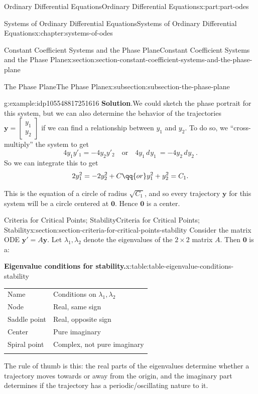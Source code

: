 \documentclass[twoside,10pt,]{book}
\newcommand{\blocktitlefont}{\relax}
\newcommand{\tabularfont}{\relax}
\numberwithin{equation}{part}
\newcommand{\hrulethick} {\noalign{\hrule height 0.11em}}
\renewcommand{\vec}[1]{\mathbf{#1}}
\providecommand{\dd}[2][]{\, d^{#1} #2\ }
\begin{document}
\begin{partptx}{Ordinary Differential Equations}{}{Ordinary Differential Equations}{}{}{x:part:part-odes}
\begin{chapterptx}{Systems of Ordinary Differential Equations}{}{Systems of Ordinary Differential Equations}{}{}{x:chapter:systems-of-odes}
\begin{sectionptx}{Constant Coefficient Systems and the Phase Plane}{}{Constant Coefficient Systems and the Phase Plane}{}{}{x:section:section-constant-coefficient-systems-and-the-phase-plane}
\begin{subsectionptx}{The Phase Plane}{}{The Phase Plane}{}{}{x:subsection:subsection-the-phase-plane}
\begin{example}{}{g:example:idp105548817251616}
\noindent\textbf{\blocktitlefont Solution}.\hypertarget{g:solution:idp105548817253664}{}\quad{}We could sketch the phase portrait for this system, but we can also determine the behavior of the trajectories \(\vec{y} = \begin{bmatrix} y_{1} \\ y_{2} \end{bmatrix} \) if we can find a relationship between \(y_{1}\) and \(y_{2}\). To do so, we ``cross-multiply'' the system to get%
\begin{equation*}
4y_{1}y'_{1} = -4y_{2}y'_{2} \quad\text{or}\quad 4y_{1}\dd{y_{1}} = -4y_{2}\dd{y_{2}}.
\end{equation*}
So we can integrate this to get%
\begin{equation*}
2y_{1}^{2} = -2y_{2}^{2}+C\qq{or}y_{1}^{2}+y_{2}^{2} = C_{1}.
\end{equation*}
%
\par
This is the equation of a circle of radius \(\sqrt{C_{1}}\), and so every trajectory \(\vec{y}\) for this system will be a circle centered at \(\vec{0}\). Hence \(\vec{0}\) is a center.%
\end{example}
\end{subsectionptx}
\end{sectionptx}
%
%
\typeout{************************************************}
\typeout{************************************************}
%
\begin{sectionptx}{Criteria for Critical Points; Stability}{}{Criteria for Critical Points; Stability}{}{}{x:section:section-criteria-for-critical-points-stability}
Consider the matrix ODE \(\vec{y}' = A\vec{y}\). Let \(\lambda_{1},\lambda_{2}\) denote the eigenvalues of the \(2\times 2\) matrix \(A\). Then \(\vec{0}\) is a:%
\begin{tableptx}{\textbf{Eigenvalue conditions for stability.}}{x:table:table-eigenvalue-conditions-stability}{}%
\centering%
{\tabularfont%
\begin{tabular}{ll}\hrulethick
Name&Conditions on \(\lambda_{1},\lambda_{2}\)\tabularnewline\hrulethick
Node&Real, same sign\tabularnewline[0pt]
Saddle point&Real, opposite sign\tabularnewline[0pt]
Center&Pure imaginary\tabularnewline[0pt]
Spiral point&Complex, not pure imaginary\tabularnewline\hrulethick
\end{tabular}
}%
\end{tableptx}%
The rule of thumb is this: the real parts of the eigenvalues determine whether a trajectory moves towards or away from the origin, and the imaginary part determines if the trajectory has a periodic\slash{}oscillating nature to it.%

\end{sectionptx}
\end{chapterptx}
\end{partptx}
\end{document}
